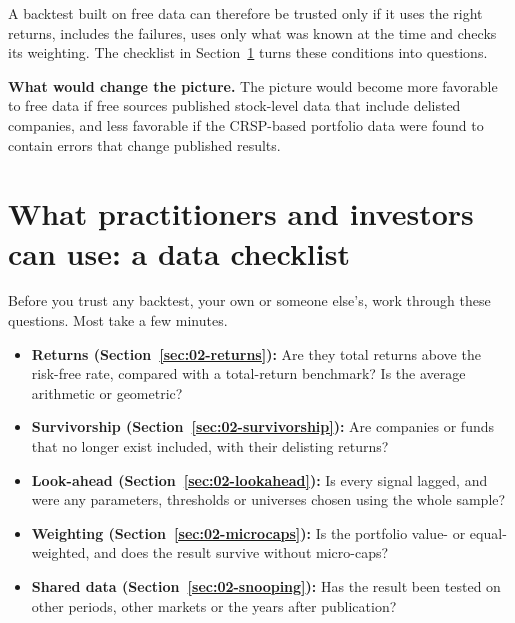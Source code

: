 A backtest built on free data can therefore be trusted only if it uses the right returns, includes the failures, uses only what was known at the time and checks its weighting. The checklist in Section~\ref{sec:02-checklist} turns these conditions into questions.

\textbf{What would change the picture.} The picture would become more favorable to free data if free sources published stock-level data that include delisted companies, and less favorable if the CRSP-based portfolio data were found to contain errors that change published results.

\section{What practitioners and investors can use: a data checklist}
\label{sec:02-checklist}

Before you trust any backtest, your own or someone else's, work through these questions. Most take a few minutes.

\begin{itemize}
  \item[$\square$] \textbf{Returns (Section~\ref{sec:02-returns}):} Are they total returns above the risk-free rate, compared with a total-return benchmark? Is the average arithmetic or geometric?
  \item[$\square$] \textbf{Survivorship (Section~\ref{sec:02-survivorship}):} Are companies or funds that no longer exist included, with their delisting returns?
  \item[$\square$] \textbf{Look-ahead (Section~\ref{sec:02-lookahead}):} Is every signal lagged, and were any parameters, thresholds or universes chosen using the whole sample?
  \item[$\square$] \textbf{Weighting (Section~\ref{sec:02-microcaps}):} Is the portfolio value- or equal-weighted, and does the result survive without micro-caps?
  \item[$\square$] \textbf{Shared data (Section~\ref{sec:02-snooping}):} Has the result been tested on other periods, other markets or the years after publication?
\end{itemize}

\makeatletter
{}
\makeatother

